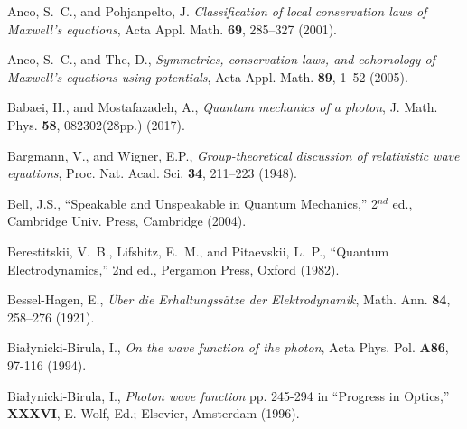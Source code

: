\documentclass[12pt]{article}
\theoremstyle{definition}
\numberwithin{equation}{section}
\begin{document}
\baselineskip=10pt

%
\begin{thebibliography}{[KTZ2020]}
	Anco, S.~C., and Pohjanpelto, J.
	\textit{Classification of local conservation laws of Maxwell's equations},
	Acta Appl. Math. \textbf{69}, 285--327 (2001).\vspace{-4pt}

	Anco, S.~C., and The, D.,
	\textit{Symmetries, conservation laws, and cohomology of Maxwell's equations using potentials},
	Acta Appl. Math. \textbf{89}, 1--52 (2005).\vspace{-4pt}

	Babaei, H., and Mostafazadeh, A.,
	\textit{Quantum mechanics of a photon},
  J. Math. Phys. \textbf{58}, 082302(28pp.) (2017).\vspace{-4pt}

        Bargmann, V., 
        and 
        Wigner, E.P.,
        \textit{Group-theoretical discussion of relativistic wave equations},
        Proc. Nat. Acad. Sci. \textbf{34}, 211--223 (1948).

        Bell, J.S.,
        ``Speakable and Unspeakable in Quantum Mechanics,'' 2$^{nd}$ ed.,
        Cambridge Univ. Press, Cambridge (2004).

        Berestitskii, V.~B.,
        Lifshitz, E.~M., 
        and
        Pitaevskii, L.~P.,
                ``{Quantum Electrodynamics},'' 2nd ed., %
        Pergamon Press, Oxford (1982).\vspace{-4pt}

  Bessel-Hagen, E.,
  {\it \"Uber die Erhaltungss\"atze der Elektrodynamik},
  Math. Ann. \textbf{84}, 258--276 (1921).\vspace{-4pt}

        Bia\l ynicki-Birula, I.,
                {\it On the wave function of the photon},
        Acta Phys. Pol. \textbf{A86}, 97-116 (1994).\vspace{-4pt}

	Bia{\l}ynicki-Birula, I.,
	\textit{Photon wave function}
	pp. 245-294 in ``Progress in Optics,'' \textbf{XXXVI},
        E. Wolf, Ed.; Elsevier, Amsterdam (1996).\vspace{-4pt}


\end{thebibliography}
\end{document}
